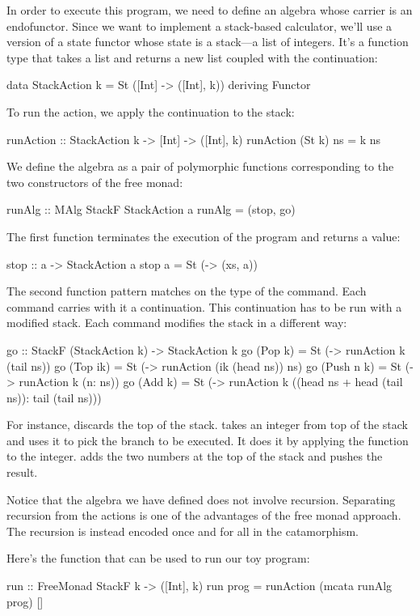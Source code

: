 \documentclass[DaoFP]{subfiles}
\begin{document}
In order to execute this program, we need to define an algebra whose carrier is an endofunctor. Since we want to implement a stack-based calculator, we'll use a version of a state functor whose state is a stack---a list of integers. It's a function type that takes a list and returns a new list coupled with the continuation:
\begin{haskell}
data StackAction k = St ([Int] -> ([Int], k))
  deriving Functor
\end{haskell}

To run the action, we apply the continuation to the stack:
\begin{haskell}
runAction :: StackAction k -> [Int] -> ([Int], k)
runAction (St k) ns = k ns
\end{haskell}

We define the algebra as a pair of polymorphic functions corresponding to the two constructors of the free monad:
\begin{haskell}
runAlg :: MAlg StackF StackAction a
runAlg = (stop, go)
\end{haskell}
The first function terminates the execution of the program and returns a value:
\begin{haskell}
stop :: a -> StackAction a
stop a = St (\xs -> (xs, a))
\end{haskell}
The second function pattern matches on the type of the command. Each command carries with it a continuation. This continuation has to be run with a modified stack. Each command modifies the stack in a different way:
\begin{haskell}
go :: StackF (StackAction k) -> StackAction k
go (Pop k)    = St (\ns -> runAction k (tail ns))
go (Top ik)   = St (\ns -> runAction (ik (head ns)) ns)
go (Push n k) = St (\ns -> runAction k (n: ns))
go (Add k)    = St (\ns -> runAction k 
                   ((head ns + head (tail ns)): tail (tail ns)))
\end{haskell}
For instance,  discards the top of the stack.  takes an integer from top of the stack and uses it to pick the branch to be executed. It does it by applying the function  to the integer.  adds the two numbers at the top of the stack and pushes the result. 

Notice that the algebra we have defined does not involve recursion. Separating recursion from the actions is one of the advantages of the free monad approach. The recursion is instead encoded once and for all in the catamorphism. 

Here's the function that can be used to run our toy program:
\begin{haskell}
run :: FreeMonad StackF k -> ([Int], k)
run prog = runAction (mcata runAlg prog) [] 
\end{haskell}
\end{document}
